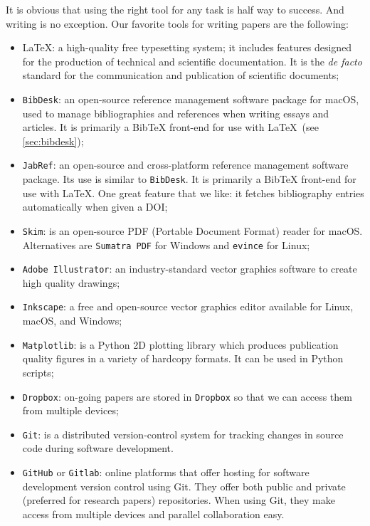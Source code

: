 \documentclass[authoryear,3p,times,preprint,review,fleqn]{elsarticle}
\numberwithin{equation}{section}
\theoremstyle{remark}
\begin{document}
It is obvious that using the right tool for any task is half way to success. And writing is no exception. Our favorite tools for writing papers are the following:

\begin{itemize}
\item \LaTeX:  a high-quality free typesetting system; it includes features designed for the production of technical and scientific documentation. It is the \textit{de facto} standard for the communication and publication of scientific documents; 
\item \texttt{BibDesk}: an open-source reference management software package for macOS, used to manage bibliographies and references when writing essays and articles. It is primarily a BibTeX front-end for use with \LaTeX\ (see \cref{sec:bibdesk});
\item \texttt{JabRef}:  an open-source and cross-platform reference management software package. Its use is similar to \texttt{BibDesk}. It is primarily a BibTeX front-end for use with \LaTeX. One great feature that we like: it fetches bibliography entries automatically when given a DOI;
\item \texttt{Skim}: is an open-source PDF (Portable Document Format) reader for macOS. Alternatives are \texttt{Sumatra PDF} for Windows and \texttt{evince} for Linux;
\item \texttt{Adobe Illustrator}: an industry-standard vector graphics software to create high quality drawings;
\item \texttt{Inkscape}: a free and open-source vector graphics editor available for Linux, macOS, and Windows;
\item \texttt{Matplotlib}: is a Python 2D plotting library which produces publication quality figures in a variety of hardcopy formats. It can be used in Python scripts;
\item \texttt{Dropbox}: on-going papers are stored in \texttt{Dropbox} so that we can access them from multiple devices;
\item \texttt{Git}: is a distributed version-control system for tracking changes in source code during software development.
\item \texttt{GitHub} or \texttt{Gitlab}: online platforms that offer hosting for software development version control using Git. They offer both public and private (preferred for research papers) repositories. When using Git, they make access from multiple devices and parallel collaboration easy.
\end{itemize}
\end{document}
